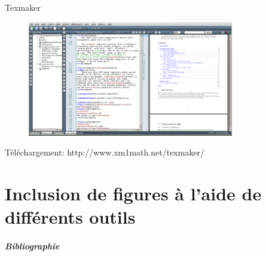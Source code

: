 \documentclass{beamer}
\begin{document}

\begin{frame}{Texmaker}

\begin{figure} %
\centering %
\includegraphics[width=9cm]{img/TexmakerView} %
\end{figure} %

{\footnotesize Téléchargement: http://www.xm1math.net/texmaker/ }

\end{frame}



\part{Inclusion de figures à l'aide de différents outils}






\begin{frame}
  \frametitle{Bibliographie}

\nocite{*}


\end{frame}


\end{document}
